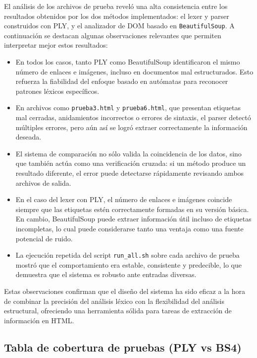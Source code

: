 \documentclass[11pt,a4paper]{article}
\begin{document}
El análisis de los archivos de prueba reveló una alta consistencia entre los resultados obtenidos por los dos métodos implementados: el lexer y parser construidos con PLY, y el analizador de DOM basado en \texttt{BeautifulSoup}. A continuación se destacan algunas observaciones relevantes que permiten interpretar mejor estos resultados:

\begin{itemize}
    \item En todos los casos, tanto PLY como BeautifulSoup identificaron el mismo número de enlaces e imágenes, incluso en documentos mal estructurados. Esto refuerza la fiabilidad del enfoque basado en autómatas para reconocer patrones léxicos específicos.

    \item En archivos como \texttt{prueba3.html} y \texttt{prueba6.html}, que presentan etiquetas mal cerradas, anidamientos incorrectos o errores de sintaxis, el parser detectó múltiples errores, pero aún así se logró extraer correctamente la información deseada.

    \item El sistema de comparación no sólo valida la coincidencia de los datos, sino que también actúa como una verificación cruzada: si un método produce un resultado diferente, el error puede detectarse rápidamente revisando ambos archivos de salida.

    \item En el caso del lexer con PLY, el número de enlaces e imágenes coincide siempre que las etiquetas estén correctamente formadas en su versión básica. En cambio, BeautifulSoup puede extraer información útil incluso de etiquetas incompletas, lo cual puede considerarse tanto una ventaja como una fuente potencial de ruido.

    \item La ejecución repetida del script \texttt{run\_all.sh} sobre cada archivo de prueba mostró que el comportamiento era estable, consistente y predecible, lo que demuestra que el sistema es robusto ante entradas diversas.
\end{itemize}

Estas observaciones confirman que el diseño del sistema ha sido eficaz a la hora de combinar la precisión del análisis léxico con la flexibilidad del análisis estructural, ofreciendo una herramienta sólida para tareas de extracción de información en HTML.

\subsection{Tabla de cobertura de pruebas (PLY vs BS4)}
\end{document}
